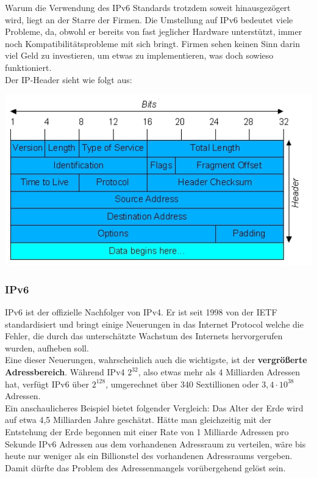 \documentclass[12pt,a4paper]{report}
\begin{document}
\begin{onehalfspace}
Warum die Verwendung des IPv6 Standards trotzdem soweit hinausgezögert wird, liegt an der Starre der Firmen. Die Umstellung auf IPv6 bedeutet viele Probleme, da, obwohl er bereits von fast jeglicher Hardware unterstützt, immer noch Kompatibilitätsprobleme mit sich bringt. Firmen sehen keinen Sinn darin viel Geld zu investieren, um etwas zu implementieren, was doch sowieso funktioniert.\\

Der IP-Header sieht wie folgt aus:\\
\begin{center}
\includegraphics[scale=1]{../docs/tarkes/pics/ipheader.jpg}
\end{center}
\subsubsection{IPv6}
IPv6 ist der offizielle Nachfolger von IPv4. Er ist seit 1998 von der IETF standardisiert und bringt einige Neuerungen in das Internet Protocol welche die Fehler, die durch das unterschätzte Wachstum des Internets hervorgerufen wurden, aufheben soll.\\

Eine dieser Neuerungen, wahrscheinlich auch die wichtigste, ist der \textbf{vergrößerte Adressbereich}. Während IPv4 $2^{32}$, also etwas mehr als 4 Milliarden Adressen hat, verfügt IPv6 über $2^{128}$, umgerechnet über 340 Sextillionen oder $3,4 \cdot 10^{38}$ Adressen.\\
Ein anschaulicheres Beispiel bietet folgender Vergleich: Das Alter der Erde wird auf etwa 4,5 Milliarden Jahre geschätzt. Hätte man gleichzeitig mit der Entstehung der Erde begonnen mit einer Rate von 1 Milliarde Adressen pro Sekunde IPv6 Adressen aus dem vorhandenen Adressraum zu verteilen, wäre bis heute nur weniger als ein Billionstel des vorhandenen Adressraums vergeben.\\
Damit dürfte das Problem des Adressenmangels vorübergehend gelöst sein.\\


\end{onehalfspace}
\end{document}

